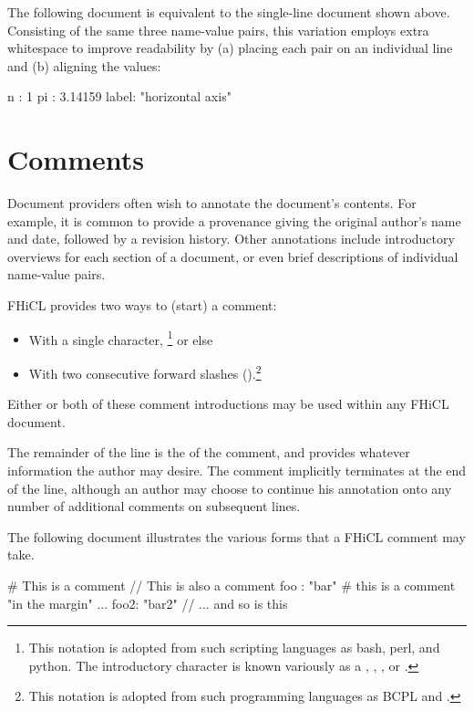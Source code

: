 \documentclass{memarticle}
\newcommand{\fhicl}{FHiCL\xspace}
\begin{document}
The following document is equivalent to the single-line document shown
above.  Consisting of the same three name-value pairs, this variation
employs extra whitespace to improve readability by (a) placing each
pair on an individual line and (b) aligning the values:
%
\Needspace{0.5in}
\begin{fcllisting}[texcl,escapechar=`]
n    : 1
pi   : 3.14159
label: "horizontal axis"
\end{fcllisting}

\chapter{Comments}

Document providers often wish to annotate the document's contents.
For example, it is common to provide a provenance giving the original
author's name and date, followed by a revision history.  Other
annotations include introductory overviews for each section of a
document, or even brief descriptions of individual name-value pairs.

\fhicl provides two ways to  (start) a comment:
\begin{itemize}
\item With a single \fclcode{#} character,%
  \footnote{%
    This notation is adopted from such scripting languages as bash,
    perl, and python.  The introductory \fclcode{#} character is known
    variously as a , , ,
    or %
    .}  or else
\item With two consecutive forward slashes (\fclcode{//}).\footnote{%
    This notation is adopted from such programming languages as BCPL
    and \cpp{}%
    .}
\end{itemize}
Either or both of these comment introductions may be used within any
\fhicl document.

The remainder of the line is the  of the comment, and
provides whatever information the author may desire.  The comment
implicitly terminates at the end of the line, although an author may
choose to continue his annotation onto any number of additional
comments on subsequent lines.

The following document illustrates the various forms that a \fhicl
comment may take.
%
\Needspace{0.67in}
\begin{fcllisting}[texcl,escapechar=`]
# This is a comment
// This is also a comment
foo : "bar"   # this is a comment "in the margin" ...
foo2: "bar2" // ... and so is this
\end{fcllisting}
\end{document}
